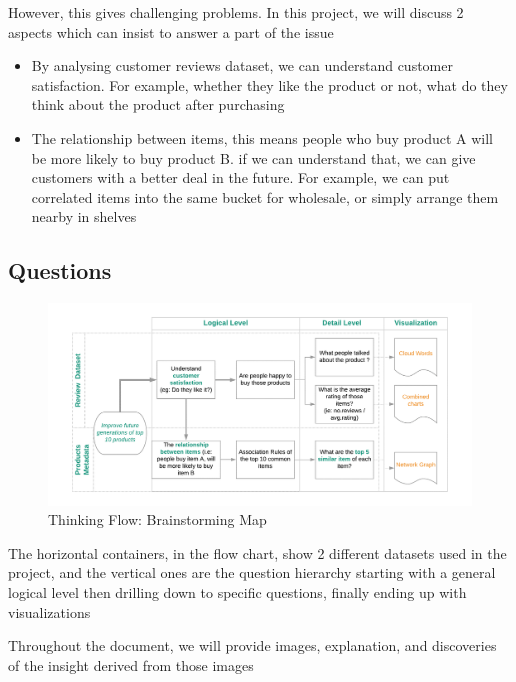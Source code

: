 \documentclass[a4paper,11pt]{article}
\begin{document}
		However, this gives  challenging problems. In this project, we will discuss 2 aspects which can insist to answer a part of the issue
		\begin{itemize}
			\item By analysing customer reviews dataset, we can understand customer satisfaction. For example, whether they like the product or not, what do they think about the product after purchasing
			\item The relationship between items, this means people who buy product A will be more likely to buy product B. if we can understand that, we can give customers with a better deal in the future. For example, we can put correlated items into the same bucket for wholesale, or simply arrange them nearby in shelves
		\end{itemize}

	\subsection{Questions}
		\begin{figure}[H]
			\includegraphics[width=1.1\textwidth, center]{pic1}
			\caption{Thinking Flow: Brainstorming Map}
		\end{figure}
		The horizontal containers, in the flow chart, show 2 different datasets used in the project, and the vertical ones are the question hierarchy starting with a general logical level then drilling down to specific questions, finally ending up with visualizations

		Throughout the document, we will provide images, explanation, and discoveries of the insight derived from those images
\end{document}
